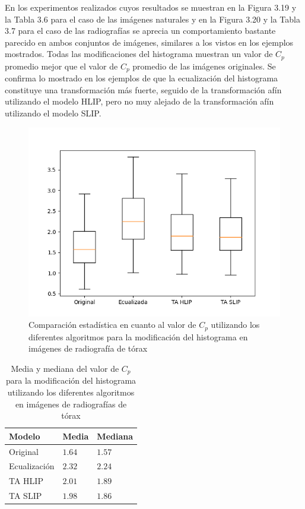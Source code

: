 En los experimentos realizados cuyos resultados se muestran en la Figura 3.19 y la Tabla 3.6 para el caso de las im\'agenes naturales y en la Figura 3.20 y la Tabla 3.7 para el caso de las radiograf\'ias se aprecia un comportamiento bastante parecido en ambos conjuntos de im\'agenes, similares a los vistos en los ejemplos mostrados. Todas las modificaciones del histograma muestran un valor de $C_p$ promedio mejor que el valor de $C_p$ promedio de las im\'agenes originales. Se confirma lo mostrado en los ejemplos de que la ecualizaci\'on del histograma constituye una transformaci\'on m\'as fuerte, seguido de la transformaci\'on af\'in utilizando el modelo HLIP, pero no muy alejado de la transformaci\'on af\'in  utilizando el modelo SLIP.

\begin{figure}
	\begin{center}
		\includegraphics[width=10.0 cm]{images/graphics/torax/affine_transform/eq_all.png}
		\caption{Comparaci\'on estad\'istica en cuanto al valor de $C_p$ utilizando los diferentes algoritmos para la modificaci\'on del histograma en im\'agenes de radiograf\'ia de t\'orax}
	\end{center}
\end{figure}

\begin{table}
	\begin{center}
		\begin{tabular}{|l|l|l|}
			\hline 
			Modelo & Media & Mediana\\
			\hline
			Original & $1.64$ & $1.57$\\
			\hline
			Ecualizaci\'on & $2.32$ & $2.24$\\
			\hline
			TA HLIP & $2.01$ & $1.89$\\
			\hline
			TA SLIP & $1.98$ & $1.86$\\
			\hline
		\end{tabular}
		\caption{Media y mediana del valor de $C_p$ para la modificaci\'on del histograma utilizando los diferentes algoritmos en im\'agenes de radiograf\'ias de t\'orax}
	\end{center}
\end{table}


